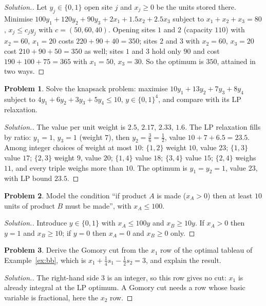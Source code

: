 \documentclass[11pt,a4paper]{article}
\numberwithin{equation}{section}
\theoremstyle{definition}
\newtheorem{problemx}{Problem}[subsection]
\newenvironment{problem}{\begin{problemx}}{\end{problemx}}
\newenvironment{solution}
  {\renewcommand{\qedsymbol}{}\begin{proof}[\textit{Solution}.]}
  {\end{proof}}
\begin{document}
\begin{solution}
Let $y_j \in \{0, 1\}$ open site $j$ and $x_j \geq 0$ be the units stored there. Minimise $100y_1 + 120y_2 + 90y_3 + 2x_1 + 1.5x_2 + 2.5x_3$ subject to $x_1 + x_2 + x_3 = 80$, $x_j \leq c_jy_j$ with $c = (50, 60, 40)$. Opening sites $1$ and $2$ (capacity $110$) with $x_2 = 60$, $x_1 = 20$ costs $220 + 90 + 40 = 350$; sites $2$ and $3$ with $x_2 = 60$, $x_3 = 20$ cost $210 + 90 + 50 = 350$ as well; sites $1$
and $3$ hold only $90$ and cost $190 + 100 + 75 = 365$ with $x_1 = 50$, $x_3 = 30$. So the optimum is $350$, attained in two ways.
\end{solution}

\begin{problem}
Solve the knapsack problem: maximise $10y_1 + 13y_2 + 7y_3 + 8y_4$ subject to $4y_1 + 6y_2 + 3y_3 + 5y_4 \leq 10$, $y \in \{0, 1\}^4$, and compare with its LP relaxation.
\end{problem}

\begin{solution}
The value per unit weight is $2.5$, $2.17$, $2.33$, $1.6$. The LP relaxation fills by ratio: $y_1 = 1$, $y_3 = 1$ (weight $7$), then $y_2 = \frac36 = \frac12$, value $10 + 7 + 6.5 = 23.5$. Among integer choices of weight at most $10$: $\{1, 2\}$ weight $10$, value $23$; $\{1, 3\}$ value $17$; $\{2, 3\}$ weight $9$, value $20$; $\{1, 4\}$ value $18$;
$\{3, 4\}$ value $15$; $\{2, 4\}$ weighs $11$, and every triple weighs more than $10$. The optimum is $y_1 = y_2 = 1$, value $23$, with LP bound $23.5$.
\end{solution}

\begin{problem}
Model the condition ``if product $A$ is made ($x_A > 0$) then at least $10$ units of product $B$ must be made'', with $x_A \leq 100$.
\end{problem}

\begin{solution}
Introduce $y \in \{0, 1\}$ with $x_A \leq 100y$ and $x_B \geq 10y$. If $x_A > 0$ then $y = 1$ and $x_B \geq 10$; if $y = 0$ then $x_A = 0$ and $x_B \geq 0$ only.
\end{solution}

\begin{problem}
Derive the Gomory cut from the $x_1$ row of the optimal tableau of Example~\ref{ex:bb}, which is $x_1 + \frac14s_1 - \frac12s_2 = 3$, and explain the result.
\end{problem}

\begin{solution}
The right-hand side $3$ is an integer, so this row gives no cut: $x_1$ is already integral at the LP optimum. A Gomory cut needs a row whose basic variable is fractional, here the $x_2$ row.
\end{solution}
\end{document}
